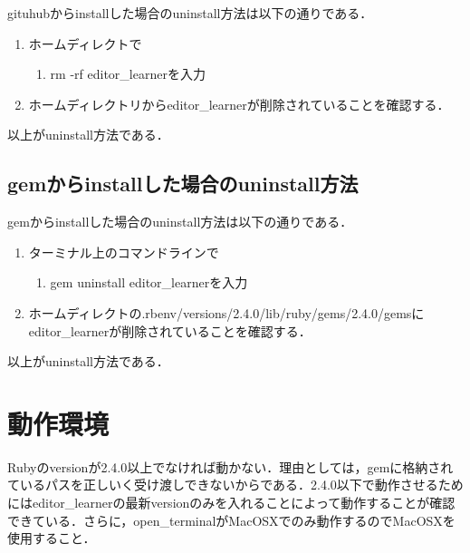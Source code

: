 gituhubからinstallした場合のuninstall方法は以下の通りである．

\begin{enumerate}
\def\labelenumi{\arabic{enumi}.}
\tightlist
\item
  ホームディレクトで

  \begin{enumerate}
  \def\labelenumii{\arabic{enumii}.}
  \tightlist
  \item
    rm -rf editor\_learnerを入力
  \end{enumerate}
\item
  ホームディレクトリからeditor\_learnerが削除されていることを確認する．
\end{enumerate}以上がuninstall方法である．

\subsection{gemからinstallした場合のuninstall方法}\label{gemux304bux3089installux3057ux305fux5834ux5408ux306euninstallux65b9ux6cd5}

gemからinstallした場合のuninstall方法は以下の通りである．

\begin{enumerate}
\def\labelenumi{\arabic{enumi}.}
\tightlist
\item
  ターミナル上のコマンドラインで

  \begin{enumerate}
  \def\labelenumii{\arabic{enumii}.}
  \tightlist
  \item
    gem uninstall editor\_learnerを入力
  \end{enumerate}
\item
  ホームディレクトの.rbenv/versions/2.4.0/lib/ruby/gems/2.4.0/gemsにeditor\_learnerが削除されていることを確認する．
\end{enumerate}以上がuninstall方法である．

    \section{動作環境}\label{ux52d5ux4f5cux74b0ux5883}

    Rubyのversionが2.4.0以上でなければ動かない．理由としては，gemに格納されているパスを正しいく受け渡しできないからである．2.4.0以下で動作させるためにはeditor\_learnerの最新versionのみを入れることによって動作することが確認できている．さらに，open\_terminalがMacOSXでのみ動作するのでMacOSXを使用すること．


